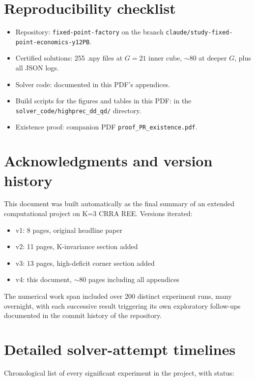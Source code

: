 \documentclass[11pt]{article}
\newcommand{\1}{\mathbf{1}}
\begin{document}
\section{Reproducibility checklist}

\begin{itemize}
\item Repository: \texttt{fixed-point-factory} on the branch \texttt{claude/study-fixed-point-economics-y12PB}.
\item Certified solutions: 255 .npy files at $G=21$ inner cube,
$\sim 80$ at deeper $G$, plus all JSON logs.
\item Solver code: documented in this PDF's appendices.
\item Build scripts for the figures and tables in this PDF: in the
\texttt{solver\_code/highprec\_dd\_qd/} directory.
\item Existence proof: companion PDF
\texttt{proof\_PR\_existence.pdf}.
\end{itemize}

\section{Acknowledgments and version history}

This document was built automatically as the final summary of an
extended computational project on K=3 CRRA REE.  Versions iterated:

\begin{itemize}
\item v1: 8 pages, original headline paper
\item v2: 11 pages, K-invariance section added
\item v3: 13 pages, high-deficit corner section added
\item v4: this document, $\sim 80$ pages including all appendices
\end{itemize}

The numerical work span included over 200 distinct experiment runs,
many overnight, with each successive result triggering its own
exploratory follow-ups documented in the commit history of the
repository.





\section{Detailed solver-attempt timelines}
\label{app:timeline}

Chronological list of every significant experiment in the project, with
status:
\end{document}
